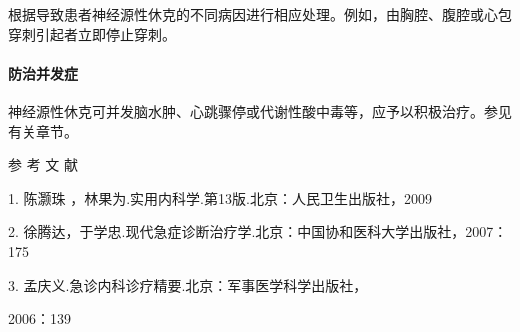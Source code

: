 根据导致患者神经源性休克的不同病因进行相应处理。例如，由胸腔、腹腔或心包穿刺引起者立即停止穿刺。

\paragraph{防治并发症}

神经源性休克可并发脑水肿、心跳骤停或代谢性酸中毒等，应予以积极治疗。参见有关章节。

\protect\hypertarget{text00066.html}{}{}

\hypertarget{text00066.htmlux5cux23CHP2-6-4}{}
参 考 文 献

1. 陈灏珠 ，林果为.实用内科学.第13版.北京：人民卫生出版社，2009

2.
徐腾达，于学忠.现代急症诊断治疗学.北京：中国协和医科大学出版社，2007：175

3. 孟庆义.急诊内科诊疗精要.北京：军事医学科学出版社，

2006：139

\protect\hypertarget{text00067.html}{}{}

